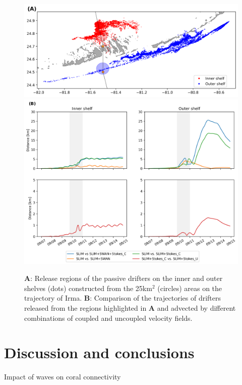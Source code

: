 \documentclass[11pt,a4paper]{article}
\begin{document}
\begin{figure}
    \centering
    \includegraphics[width=.85\textwidth]{fig/inner_outer_regions.png}
    \includegraphics[width=.99\textwidth]{fig/inner_outer.png}
    \caption{\textbf{A}: Release regions of the passive drifters on the inner and outer shelves (dots) constructed from the 25km$^\text{2}$ (circles) areas on the trajectory of Irma. \textbf{B}: Comparison of the trajectories of drifters released from the regions highlighted in \textbf{A} and advected by different combinations of coupled and uncoupled velocity fields.}
    \label{fig:traj}
\end{figure}

\section{Discussion and conclusions}

Impact of waves on coral connectivity
\end{document}
